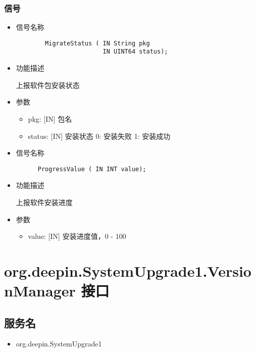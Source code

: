 \documentclass{utart}
\begin{document}
\subsubsection{信号}
\begin{itemize}
    \item 信号名称
    
    \begin{verbatim}
        MigrateStatus ( IN String pkg 
                        IN UINT64 status);
      \end{verbatim}

    \item 功能描述
    
    上报软件包安装状态
    \item 参数
        \begin{itemize}
            \item pkg: [IN] 包名
            \item status: [IN] 安装状态 0: 安装失败 1: 安装成功
        \end{itemize}
\end{itemize}

\begin{itemize}
  \item 信号名称
  
  \begin{verbatim}
      ProgressValue ( IN INT value);
    \end{verbatim}

  \item 功能描述
  
  上报软件安装进度
  \item 参数
      \begin{itemize}
          \item value: [IN] 安装进度值，0 - 100
      \end{itemize}
\end{itemize}

\section{org.deepin.SystemUpgrade1.VersionManager 接口}
\subsection{服务名}
\begin{itemize}
    \item org.deepin.SystemUpgrade1
\end{itemize}
\end{document}
